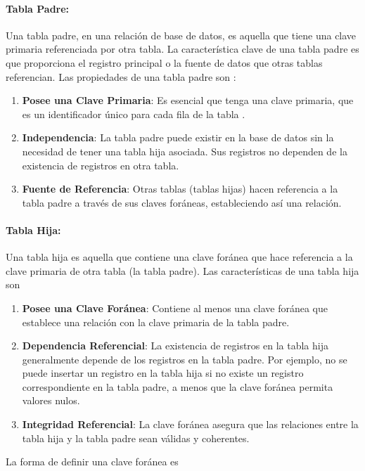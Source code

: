  \paragraph{Tabla Padre:} Una tabla padre, en una relación de base de datos, es aquella que tiene una clave primaria referenciada por otra tabla. La característica clave de una tabla padre es que proporciona el registro principal o la fuente de datos que otras tablas referencian. Las propiedades de una tabla padre son :

 \begin{enumerate}
     \item \textbf{Posee una Clave Primaria}: Es esencial que tenga una clave primaria, que es un identificador único para cada fila de la tabla .
     \item \textbf{Independencia}: La tabla padre puede existir en la base de datos sin la necesidad de tener una tabla hija asociada. Sus registros no dependen de la existencia de registros en otra tabla.
     \item \textbf{Fuente de Referencia}: Otras tablas (tablas hijas) hacen referencia a la tabla padre a través de sus claves foráneas, estableciendo así una relación.
 \end{enumerate}

 \paragraph{Tabla Hija:} Una tabla hija es aquella que contiene una clave foránea que hace referencia a la clave primaria de otra tabla (la tabla padre). Las características de una tabla hija son
 \begin{enumerate}
     \item \textbf{Posee una Clave Foránea}: Contiene al menos una clave foránea que establece una relación con la clave primaria de la tabla padre.
     \item \textbf{Dependencia Referencial}: La existencia de registros en la tabla hija generalmente depende de los registros en la tabla padre. Por ejemplo, no se puede insertar un registro en la tabla hija si no existe un registro correspondiente en la tabla padre, a menos que la clave foránea permita valores nulos.
     \item \textbf{Integridad Referencial}: La clave foránea asegura que las relaciones entre la tabla hija y la tabla padre sean válidas y coherentes.
 \end{enumerate}

 La forma de definir una clave foránea es 

